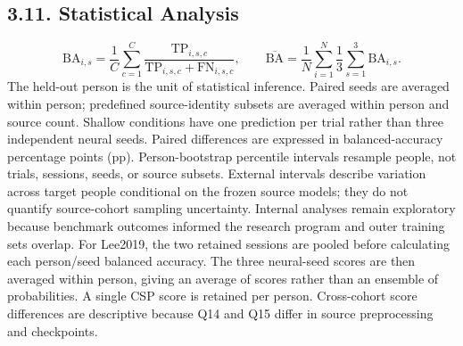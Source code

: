 \documentclass[11pt]{article}
\begin{document}
\subsection*{3.11. Statistical Analysis}
\begin{equation*}
\mathrm{BA}_{i,s}=\frac{1}{C}\sum_{c=1}^{C}\frac{\mathrm{TP}_{i,s,c}}{\mathrm{TP}_{i,s,c}+\mathrm{FN}_{i,s,c}},\qquad\overline{\mathrm{BA}}=\frac{1}{N}\sum_{i=1}^{N}\frac{1}{3}\sum_{s=1}^{3}\mathrm{BA}_{i,s}.
\end{equation*}
The held-out person is the unit of statistical inference. Paired seeds are averaged within person; predefined source-identity subsets are averaged within person and source count. Shallow conditions have one prediction per trial rather than three independent neural seeds. Paired differences are expressed in balanced-accuracy percentage points (pp). Person-bootstrap percentile intervals resample people, not trials, sessions, seeds, or source subsets. External intervals describe variation across target people conditional on the frozen source models; they do not quantify source-cohort sampling uncertainty. Internal analyses remain exploratory because benchmark outcomes informed the research program and outer training sets overlap. For Lee2019, the two retained sessions are pooled before calculating each person/seed balanced accuracy. The three neural-seed scores are then averaged within person, giving an average of scores rather than an ensemble of probabilities. A single CSP score is retained per person. Cross-cohort score differences are descriptive because Q14 and Q15 differ in source preprocessing and checkpoints.
\end{document}
